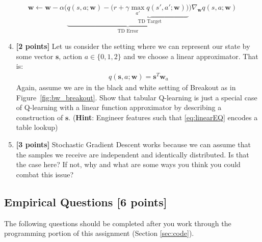 \documentclass[11pt]{article}
\numberwithin{equation}{section} %
\numberwithin{figure}{section} %
\numberwithin{table}{section} %
\newcommand{\sv}{\mathbf{s}}
\newcommand{\wv}{\mathbf{w}}
\newcommand{\points}[1]{{\bf [#1 points]}}
\begin{document}
\begin{align}
\wv \leftarrow \wv - \alpha \bigg( \underbrace{q(s, a; \wv) - \underbrace{\big (r + \gamma \max_{a'}q(s', a'; \wv)\big)}_{\text{TD Target}}}_{\text{TD Error}} \bigg) \nabla_\wv q(s, a; \wv)
\end{align}

\begin{enumerate}
\setcounter{enumi}{3}
\item \textbf{[2 points]} Let us consider the setting where we can represent our state by some vector $\sv$, action $a \in \{0, 1, 2\}$ and we choose a linear approximator. That is:
\begin{align}
\label{eq:linearEQ}
q(\sv, a; \wv) = \sv^T\wv_a
\end{align}
Again, assume we are in the black and white setting of Breakout as in Figure~\ref{fig:bw_breakout}. Show that tabular Q-learning is just a special case of Q-learning with a linear function approximator by describing a construction of $\sv$. (\textbf{Hint}: Engineer features such that \ref{eq:linearEQ} encodes a table lookup)

\begin{tcolorbox}[fit,height=4cm, width=\linewidth, blank, borderline={1pt}{-2pt},nobeforeafter]
\end{tcolorbox}


\item \textbf{[3 points]} Stochastic Gradient Descent works because we can assume that the samples we receive are independent and identically distributed. Is that the case here? If not, why and what are some ways you think you could combat this issue?

\begin{tcolorbox}[fit,height=3cm, width=\linewidth, blank, borderline={1pt}{-2pt},nobeforeafter]
\end{tcolorbox}


\end{enumerate}




\clearpage
\subsection{Empirical Questions \points{6}}

The following questions should be completed after you work through the programming portion of this assignment (Section \ref{sec:code}). 
\end{document}
